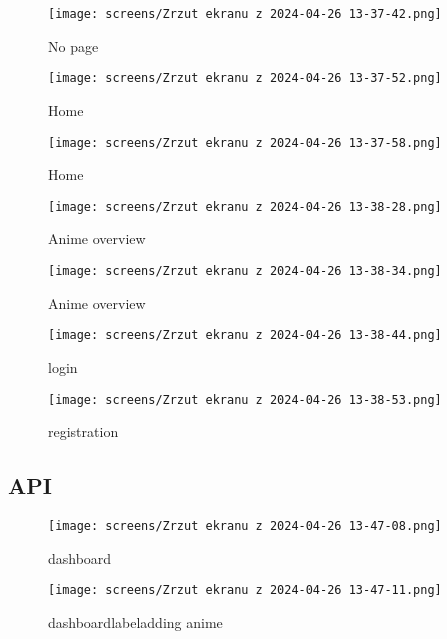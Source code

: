 \documentclass[a4paper]{article}
\begin{document}
\begin{figure}[ht!]
    \centering
    \texttt{[image: screens/Zrzut ekranu z 2024-04-26 13-37-42.png]}
    \caption{No page\label{notfound}}
\end{figure}

\begin{figure}[ht!]
    \centering
    \texttt{[image: screens/Zrzut ekranu z 2024-04-26 13-37-52.png]}
    \caption{Home\label{homepage0}}
\end{figure}

\begin{figure}[ht!]
    \centering
    \texttt{[image: screens/Zrzut ekranu z 2024-04-26 13-37-58.png]}
    \caption{Home\label{homepage1}}
\end{figure}

\begin{figure}[ht!]
    \centering
    \texttt{[image: screens/Zrzut ekranu z 2024-04-26 13-38-28.png]}
    \caption{Anime overview\label{anime0}}
\end{figure}

\begin{figure}[ht!]
    \centering
    \texttt{[image: screens/Zrzut ekranu z 2024-04-26 13-38-34.png]}
    \caption{Anime overview\label{anime1}}
\end{figure}

\begin{figure}[ht!]
    \centering
    \texttt{[image: screens/Zrzut ekranu z 2024-04-26 13-38-44.png]}
    \caption{login\label{login}}
\end{figure}

\begin{figure}[ht!]
    \centering
    \texttt{[image: screens/Zrzut ekranu z 2024-04-26 13-38-53.png]}
    \caption{registration\label{register}}
\end{figure}

\subsection{API}

\begin{figure}[ht!]
    \centering
    \texttt{[image: screens/Zrzut ekranu z 2024-04-26 13-47-08.png]}
    \caption{dashboard\label{dashboard}}
\end{figure}

\begin{figure}[ht!]
    \centering
    \texttt{[image: screens/Zrzut ekranu z 2024-04-26 13-47-11.png]}
    \caption{dashboardlabel{adding anime}}
\end{figure}
\end{document}
